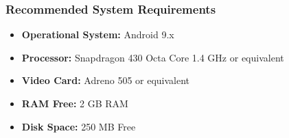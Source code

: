 \subsubsection{Recommended System Requirements}

\begin {itemize}	
	\item \textbf{Operational System:} Android 9.x
	\item \textbf{Processor: } Snapdragon 430 Octa Core 1.4 GHz or equivalent
	\item \textbf{Video Card:}  Adreno 505 or equivalent
	\item \textbf{RAM Free:}  2 GB RAM
	\item \textbf{Disk Space:} 250 MB Free

\end {itemize}

\pagebreak 